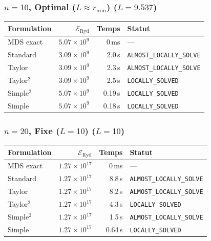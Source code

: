 \subsubsection{$n=10$, Optimal ($L{\approx}r_{\min}$) ($L=9.537$)}
\begin{longtable}{@{}lrrl@{}}
  \toprule
  Formulation & $\mathcal{E}_{\mathrm{Ryd}}$ & Temps & Statut \\
  \midrule
  \endhead
  MDS exact & $5.07\times10^{9}$ & 0\,ms & --- \\
  Standard & $3.09\times10^{9}$ & 2.0\,s & \texttt{ALMOST\_LOCALLY\_SOLVE} \\
  Taylor & $3.09\times10^{9}$ & 2.3\,s & \texttt{ALMOST\_LOCALLY\_SOLVE} \\
  Taylor$^2$ & $3.09\times10^{9}$ & 2.5\,s & \texttt{LOCALLY\_SOLVED} \\
  Simple$^2$ & $5.07\times10^{9}$ & 0.19\,s & \texttt{LOCALLY\_SOLVED} \\
  Simple & $5.07\times10^{9}$ & 0.18\,s & \texttt{LOCALLY\_SOLVED} \\
  \bottomrule
\end{longtable}

\subsubsection{$n=20$, Fixe ($L{=}10$) ($L=10$)}
\begin{longtable}{@{}lrrl@{}}
  \toprule
  Formulation & $\mathcal{E}_{\mathrm{Ryd}}$ & Temps & Statut \\
  \midrule
  \endhead
  MDS exact & $1.27\times10^{17}$ & 0\,ms & --- \\
  Standard & $1.27\times10^{17}$ & 8.8\,s & \texttt{ALMOST\_LOCALLY\_SOLVE} \\
  Taylor & $1.27\times10^{17}$ & 8.2\,s & \texttt{ALMOST\_LOCALLY\_SOLVE} \\
  Taylor$^2$ & $1.27\times10^{17}$ & 4.3\,s & \texttt{LOCALLY\_SOLVED} \\
  Simple$^2$ & $1.27\times10^{17}$ & 1.5\,s & \texttt{ALMOST\_LOCALLY\_SOLVE} \\
  Simple & $1.27\times10^{17}$ & 0.64\,s & \texttt{LOCALLY\_SOLVED} \\
  \bottomrule
\end{longtable}

